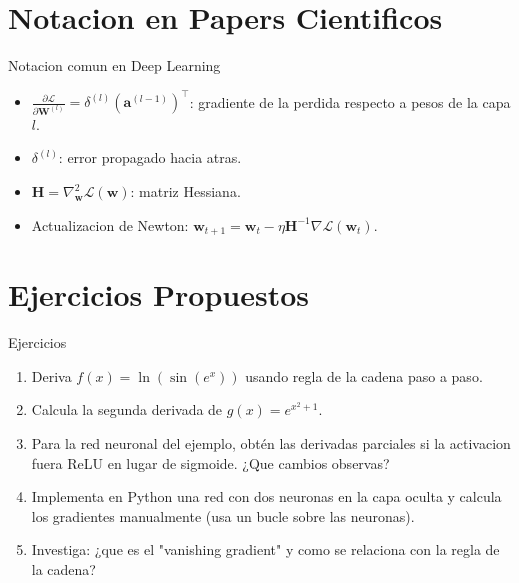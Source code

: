 \documentclass[aspectratio=169, 10pt, xcolor=table]{beamer}
\begin{document}
\section{Notacion en Papers Cientificos}

\begin{frame}{Notacion comun en Deep Learning}
    \begin{itemize}
        \item $\frac{\partial \mathcal{L}}{\partial \mathbf{W}^{(l)}} = \delta^{(l)} (\mathbf{a}^{(l-1)})^{\top}$: gradiente de la perdida respecto a pesos de la capa $l$.
        \item $\delta^{(l)}$: error propagado hacia atras.
        \item $\mathbf{H} = \nabla^2_{\mathbf{w}} \mathcal{L}(\mathbf{w})$: matriz Hessiana.
        \item Actualizacion de Newton: $\mathbf{w}_{t+1} = \mathbf{w}_t - \eta \mathbf{H}^{-1} \nabla \mathcal{L}(\mathbf{w}_t)$.
    \end{itemize}
\end{frame}

\section{Ejercicios Propuestos}

\begin{frame}{Ejercicios}
    \begin{enumerate}
        \item Deriva $f(x) = \ln(\sin(e^x))$ usando regla de la cadena paso a paso.
        \item Calcula la segunda derivada de $g(x) = e^{x^2+1}$.
        \item Para la red neuronal del ejemplo, obtén las derivadas parciales si la activacion fuera ReLU en lugar de sigmoide. ¿Que cambios observas?
        \item Implementa en Python una red con dos neuronas en la capa oculta y calcula los gradientes manualmente (usa un bucle sobre las neuronas).
        \item Investiga: ¿que es el "vanishing gradient" y como se relaciona con la regla de la cadena?
    \end{enumerate}
\end{frame}
\end{document}
